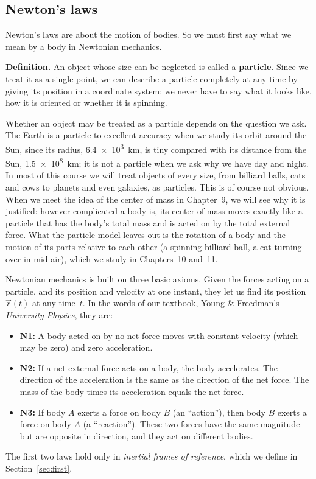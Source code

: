 \documentclass[11pt,a4paper]{article}
\begin{document}
\subsection{Newton's laws}\label{sec:laws}

Newton's laws are about the motion of bodies. So we must first say what we mean by a body in
Newtonian mechanics.

\textbf{Definition.} An object whose size can be neglected is called a \textbf{particle}. Since we
treat it as a single point, we can describe a particle completely at any time by giving its
position in a coordinate system: we never have to say what it looks like, how it is oriented or
whether it is spinning.

Whether an object may be treated as a particle depends on the question we ask. The Earth is a
particle to excellent accuracy when we study its orbit around the Sun, since its radius,
\qty{6.4e3}{km}, is tiny compared with its distance from the Sun, \qty{1.5e8}{km}; it is not a
particle when we ask why we have day and night. In most of this course we will treat objects of
every size, from billiard balls, cats and cows to planets and even galaxies, as particles. This is of course
not obvious. When we meet the idea of the center of mass in Chapter~9, we will see why it is
justified: however complicated a body is, its center of mass moves exactly like a particle that
has the body's total mass and is acted on by the total external force. What the particle model
leaves out is the rotation of a body and the motion of its parts relative to each other (a spinning
billiard ball, a cat turning over in mid-air), which we study in Chapters~10 and~11.

Newtonian mechanics is built on three basic axioms. Given the forces acting on a particle, and its
position and velocity at one instant, they let us find its position $\vec{r}(t)$ at any time~$t$.
In the words of our textbook, Young \& Freedman's \emph{University Physics}, they are:
\begin{itemize}
  \item \textbf{N1:} A body acted on by no net force moves with constant velocity (which may be
    zero) and zero acceleration.
  \item \textbf{N2:} If a net external force acts on a body, the body accelerates. The direction
    of the acceleration is the same as the direction of the net force. The mass of the body times
    its acceleration equals the net force.
  \item \textbf{N3:} If body $A$ exerts a force on body $B$ (an ``action''), then body $B$ exerts a
    force on body $A$ (a ``reaction''). These two forces have the same magnitude but are opposite
    in direction, and they act on different bodies.
\end{itemize}
The first two laws hold only in \emph{inertial frames of reference}, which we define in
Section~\ref{sec:first}.
\end{document}
